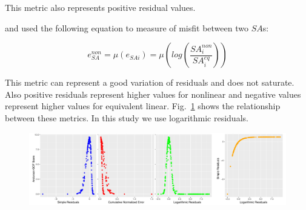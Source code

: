 This metric also represents positive residual values. 

\citet{Assimaki2012} and \citet{Carlton2016comparison} used the following equation to measure of misfit between two $SA$s:

\begin{equation}
e_{SA}^{non}=\mu(e_{SAi})=\mu(log(\frac{SA_{i}^{non}}{SA_{i}^{eq}}))
\end{equation}

This metric can represent a good variation of residuals and does not saturate. Also positive residuals represent higher values for nonlinear and negative values represent higher values for equivalent linear. Fig.~\ref{fig:response_spectra_sensitivity} shows the relationship between these metrics. In this study we use logarithmic residuals. 


\begin{figure}[H]
    \centering
    \includegraphics[width=\textwidth]{figures/pdf/response_spectra_sensitivity.pdf}
    \caption{}
    \label{fig:response_spectra_sensitivity}
\end{figure}


